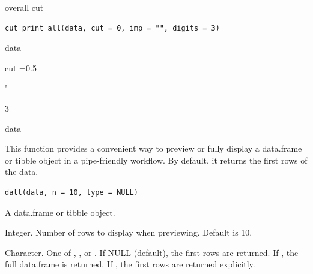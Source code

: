 \documentclass[a4paper]{book}
\begin{document}
%
\begin{Description}
overall cut
\end{Description}
%
\begin{Usage}
\begin{verbatim}
cut_print_all(data, cut = 0, imp = "", digits = 3)
\end{verbatim}
\end{Usage}
%
\begin{Arguments}
\begin{ldescription}
\item[\code{data}] data

\item[\code{cut}] cut =0.5

\item[\code{imp}] "

\item[\code{digits}] 3
\end{ldescription}
\end{Arguments}
%
\begin{Value}
data
\end{Value}
%
\begin{Description}
This function provides a convenient way to preview or fully display
a data.frame or tibble object in a pipe-friendly workflow.
By default, it returns the first  rows of the data.
\end{Description}
%
\begin{Usage}
\begin{verbatim}
dall(data, n = 10, type = NULL)
\end{verbatim}
\end{Usage}
%
\begin{Arguments}
\begin{ldescription}
\item[\code{data}] A data.frame or tibble object.

\item[\code{n}] Integer. Number of rows to display when previewing. Default is 10.

\item[\code{type}] Character. One of , , or .
If NULL (default), the first  rows are returned.
If , the full data.frame is returned.
If , the first  rows are returned explicitly.
\end{ldescription}
\end{Arguments}
\end{document}
